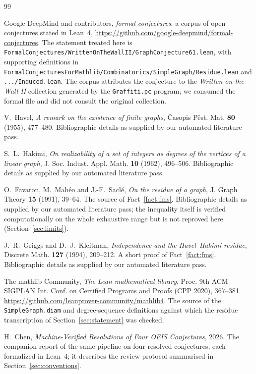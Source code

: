 \begin{thebibliography}{99}

Google DeepMind and contributors,
\emph{formal-conjectures}: a corpus of open conjectures stated in Lean~4,
\url{https://github.com/google-deepmind/formal-conjectures}.
The statement treated here is
\texttt{FormalConjectures/WrittenOnTheWallII/GraphConjecture61.lean}, with supporting
definitions in
\texttt{FormalConjecturesForMathlib/Combinatorics/SimpleGraph/Residue.lean} and
\texttt{.../Induced.lean}. The corpus attributes the conjecture to the
\emph{Written on the Wall II} collection generated by the \texttt{Graffiti.pc} program; we
consumed the formal file and did not consult the original collection.

V.~Havel,
\emph{A remark on the existence of finite graphs},
\v{C}asopis P\v{e}st. Mat. \textbf{80} (1955), 477--480.
Bibliographic details as supplied by our automated literature pass.

S.~L.~Hakimi,
\emph{On realizability of a set of integers as degrees of the vertices of a linear graph},
J. Soc. Indust. Appl. Math. \textbf{10} (1962), 496--506.
Bibliographic details as supplied by our automated literature pass.

O.~Favaron, M.~Mah\'eo and J.-F.~Sacl\'e,
\emph{On the residue of a graph},
J. Graph Theory \textbf{15} (1991), 39--64.
The source of Fact~\ref{fact:fms}. Bibliographic details as supplied by our automated
literature pass; the inequality itself is verified computationally on the whole exhaustive
range but is not reproved here (Section~\ref{sec:limits}).

J.~R.~Griggs and D.~J.~Kleitman,
\emph{Independence and the Havel--Hakimi residue},
Discrete Math. \textbf{127} (1994), 209--212.
A short proof of Fact~\ref{fact:fms}. Bibliographic details as supplied by our automated
literature pass.

The mathlib Community,
\emph{The Lean mathematical library},
Proc. 9th ACM SIGPLAN Int. Conf. on Certified Programs and Proofs (CPP 2020), 367--381.
\url{https://github.com/leanprover-community/mathlib4}.
The source of the \texttt{SimpleGraph.diam} and degree-sequence definitions against which
the residue transcription of Section~\ref{sec:statement} was checked.

H.~Chen,
\emph{Machine-Verified Resolutions of Four OEIS Conjectures}, 2026.
The companion report of the same pipeline on four resolved conjectures, each formalized in
Lean~4; it describes the review protocol summarised in Section~\ref{sec:conventions}.


\end{thebibliography}
